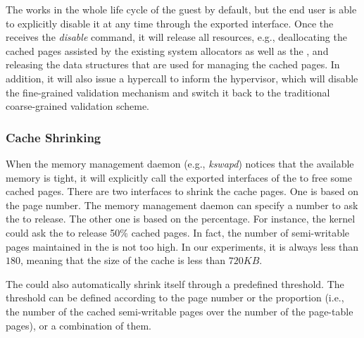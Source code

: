 The \cache works in the whole life cycle of the guest by default, but the end user is able to explicitly disable it at any time through the exported interface.
Once the \cache receives the \emph{disable} command, it will release all resources, e.g., deallocating the cached pages assisted by the existing system allocators as well as the \module, and releasing the data structures that are used for managing the cached pages.
In addition, it will also issue a hypercall to inform the hypervisor, which will disable the fine-grained validation mechanism and switch it back to the traditional coarse-grained validation scheme.

\subsubsection{Cache Shrinking}
When the memory management daemon (e.g., \emph{kswapd}) notices that the available memory is tight, it will explicitly call the exported interfaces of the \cache to free some cached pages.
There are two interfaces to shrink the cache pages. One is based on the page number. The memory management daemon can specify a number to ask the \cache to release.
The other one is based on the percentage. For instance, the kernel could ask the \cache to release 50\% cached pages.
In fact, the number of semi-writable pages maintained in the \cache is not too high. In our experiments, it is always less than $180$, meaning that the size of the cache is less than $720KB$.

The \cache could also automatically shrink itself through a predefined threshold.
The threshold can be defined according to the page number or the proportion (i.e., the number of the cached semi-writable pages over the number of the page-table pages), or a combination of them.






